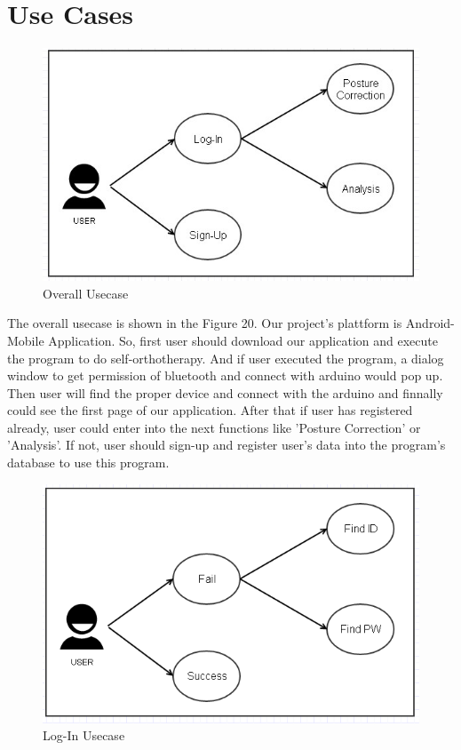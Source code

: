 \documentclass[conference]{IEEEtran}
\begin{document}
\section{Use Cases}
\begin{figure}[H]
\begin{center}
    \includegraphics[scale=0.6]{img_17.jpg}
    \caption{Overall Usecase} 
\end{center}
\end{figure}

The overall usecase is shown in the Figure 20. Our project's plattform is Android-Mobile Application. So, first user should download our application and execute the program to do self-orthotherapy. And if user executed the program, a dialog window to get permission of bluetooth and connect with arduino would pop up. Then user will find the proper device and connect with the arduino and finnally could see the first page of our application. After that if user has registered already, user could enter into the next functions like 'Posture Correction' or 'Analysis'. If not, user should sign-up and register user’s data into the program's database to use this program.   

\begin{figure}[H]
\begin{center}
    \includegraphics[scale=0.5]{img_18.png}
    \caption{Log-In Usecase} 
\end{center}
\end{figure}
 		
\end{document}
